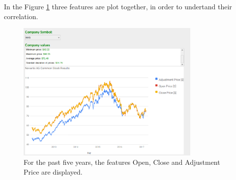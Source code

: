 In the Figure \ref{fig:nvs_stock_results} three features are plot together, in order to undertand their correlation.
\begin{figure}[H]
\centering
\includegraphics[width=0.8\textwidth]{figures/nvs_stock_results2.png}
\caption{\label{fig:data}For the past five years, the features Open, Close and Adjustment Price are displayed.}
\label{fig:nvs_stock_results}
\end{figure}

